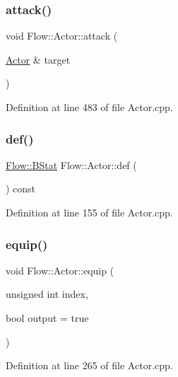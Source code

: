 \subsubsection{\texorpdfstring{attack()}{attack()}}
{\footnotesize\ttfamily void Flow\+::\+Actor\+::attack (\begin{DoxyParamCaption}\item[{\hyperlink{class_flow_1_1_actor}{Actor} \&}]{target }\end{DoxyParamCaption})}



Definition at line 483 of file Actor.\+cpp.

\hypertarget{class_flow_1_1_actor_a745ae0efb3531935e92e0929b995cd96}{}\label{class_flow_1_1_actor_a745ae0efb3531935e92e0929b995cd96} 
\subsubsection{\texorpdfstring{def()}{def()}}
{\footnotesize\ttfamily \hyperlink{class_flow_1_1_b_stat}{Flow\+::\+B\+Stat} Flow\+::\+Actor\+::def (\begin{DoxyParamCaption}{ }\end{DoxyParamCaption}) const}



Definition at line 155 of file Actor.\+cpp.

\hypertarget{class_flow_1_1_actor_a4433bb3ae20b14962659588c259da624}{}\label{class_flow_1_1_actor_a4433bb3ae20b14962659588c259da624} 
\subsubsection{\texorpdfstring{equip()}{equip()}\hspace{0.1cm}{\footnotesize\ttfamily [1/2]}}
{\footnotesize\ttfamily void Flow\+::\+Actor\+::equip (\begin{DoxyParamCaption}\item[{unsigned int}]{index,  }\item[{bool}]{output = {\ttfamily true} }\end{DoxyParamCaption})}



Definition at line 265 of file Actor.\+cpp.

\hypertarget{class_flow_1_1_actor_acf1918a44fafa59fd8bde330d4b9f01c}{}\label{class_flow_1_1_actor_acf1918a44fafa59fd8bde330d4b9f01c} 

